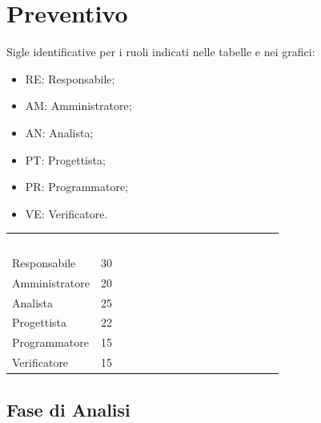 \section{Preventivo}
Sigle identificative per i ruoli indicati nelle tabelle e nei grafici:
\begin{itemize}
    \item RE: Responsabile;
    \item AM: Amministratore;
    \item AN: Analista;
    \item PT: Progettista;
    \item PR: Programmatore;
    \item VE: Verificatore.
\end{itemize}
{
	
\renewcommand{\arraystretch}{2}
\begin{table}[h!]
\centering
\caption{Tabella con i costi per ogni ruolo}
\begin{longtable}{ C{2cm} C{3cm}}
	\textcolor{white}{\textbf{Ruolo}} & 
	\textcolor{white}{\textbf{Costo per ora espresso in euro}}\\	
			
			Responsabile & 30\\
			Amministratore & 20\\
			Analista & 25\\
			Progettista & 22\\
			Programmatore & 15\\
			Verificatore & 15\\
			
		\end{longtable}
		
	\end{table}

}

\clearpage
\subsection{Fase di Analisi}
